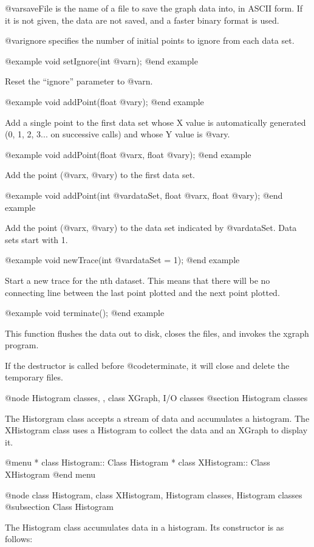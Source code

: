 @var{saveFile} is the name of a file to save the graph data into, in
ASCII form.  If it is not given, the data are not saved, and a faster
binary format is used.

@var{ignore} specifies the number of initial points to ignore from
each data set.

@example
void setIgnore(int @var{n});
@end example

Reset the ``ignore'' parameter to @var{n}.

@example
void addPoint(float @var{y});
@end example

Add a single point to the first data set whose X value is
automatically generated (0, 1, 2, 3... on successive calls)
and whose Y value is @var{y}.

@example
void addPoint(float @var{x}, float @var{y});
@end example

Add the point (@var{x}, @var{y}) to the first data set.

@example
void addPoint(int @var{dataSet}, float @var{x}, float @var{y});
@end example

Add the point (@var{x}, @var{y}) to the data set indicated by
@var{dataSet}.  Data sets start with 1.

@example
void newTrace(int @var{dataSet} = 1);
@end example

Start a new trace for the nth dataset.  This means that there will be
no connecting line between the last point plotted and the next point
plotted.

@example
void terminate();
@end example

This function flushes the data out to disk, closes the files, and
invokes the xgraph program.

If the destructor is called before @code{terminate}, it will close and
delete the temporary files.

@node Histogram classes,  , class XGraph, I/O classes
@section Histogram classes

The Historgram class accepts a stream of data and accumulates a
histogram.  The XHistogram class uses a Histogram to collect the
data and an XGraph to display it.

@menu
* class Histogram::             Class Histogram
* class XHistogram::            Class XHistogram
@end menu

@node class Histogram, class XHistogram, Histogram classes, Histogram classes
@subsection Class Histogram

The Histogram class accumulates data in a histogram.  Its constructor
is as follows:

